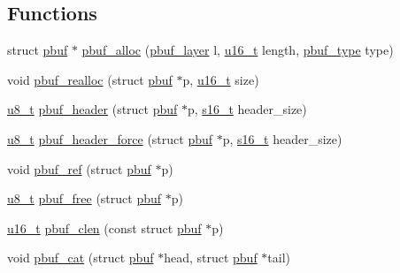 \subsection*{Functions}
\begin{DoxyCompactItemize}
\item 
struct \hyperlink{structpbuf}{pbuf} $\ast$ \hyperlink{group__pbuf_ga8bb9c5d54a06995b1c67ce695ead9969}{pbuf\+\_\+alloc} (\hyperlink{group__pbuf_gaee1baa59bb2f85ba575b5a8619ac1ebf}{pbuf\+\_\+layer} l, \hyperlink{group__compiler__abstraction_ga77570ac4fcab86864fa1916e55676da2}{u16\+\_\+t} length, \hyperlink{group__pbuf_gab7e0e32fcc292c0d7107721766ed92fb}{pbuf\+\_\+type} type)
\item 
void \hyperlink{group__pbuf_ga50abfe830a33a1a47a562febee66015d}{pbuf\+\_\+realloc} (struct \hyperlink{structpbuf}{pbuf} $\ast$p, \hyperlink{group__compiler__abstraction_ga77570ac4fcab86864fa1916e55676da2}{u16\+\_\+t} size)
\item 
\hyperlink{group__compiler__abstraction_ga4caecabca98b43919dd11be1c0d4cd8e}{u8\+\_\+t} \hyperlink{openmote-cc2538_2lwip_2src_2include_2lwip_2pbuf_8h_aaa17c1951cf2d207b6adfd3947d91f00}{pbuf\+\_\+header} (struct \hyperlink{structpbuf}{pbuf} $\ast$p, \hyperlink{group__compiler__abstraction_gacf46f4df0ebab84edebcb69967fdf86b}{s16\+\_\+t} header\+\_\+size)
\item 
\hyperlink{group__compiler__abstraction_ga4caecabca98b43919dd11be1c0d4cd8e}{u8\+\_\+t} \hyperlink{openmote-cc2538_2lwip_2src_2include_2lwip_2pbuf_8h_a27480c41c34021d4417691d327163626}{pbuf\+\_\+header\+\_\+force} (struct \hyperlink{structpbuf}{pbuf} $\ast$p, \hyperlink{group__compiler__abstraction_gacf46f4df0ebab84edebcb69967fdf86b}{s16\+\_\+t} header\+\_\+size)
\item 
void \hyperlink{group__pbuf_ga77f6bbd69e45e542014d9c547c7da74e}{pbuf\+\_\+ref} (struct \hyperlink{structpbuf}{pbuf} $\ast$p)
\item 
\hyperlink{group__compiler__abstraction_ga4caecabca98b43919dd11be1c0d4cd8e}{u8\+\_\+t} \hyperlink{group__pbuf_gab0dd696fb4b6bc65e548944584f1738b}{pbuf\+\_\+free} (struct \hyperlink{structpbuf}{pbuf} $\ast$p)
\item 
\hyperlink{group__compiler__abstraction_ga77570ac4fcab86864fa1916e55676da2}{u16\+\_\+t} \hyperlink{openmote-cc2538_2lwip_2src_2include_2lwip_2pbuf_8h_a5df7ac5ae59012fe9aeddba375a72190}{pbuf\+\_\+clen} (const struct \hyperlink{structpbuf}{pbuf} $\ast$p)
\item 
void \hyperlink{group__pbuf_ga82429084fe29015509c9b4a072707cd4}{pbuf\+\_\+cat} (struct \hyperlink{structpbuf}{pbuf} $\ast$head, struct \hyperlink{structpbuf}{pbuf} $\ast$tail)

\end{DoxyCompactItemize}
